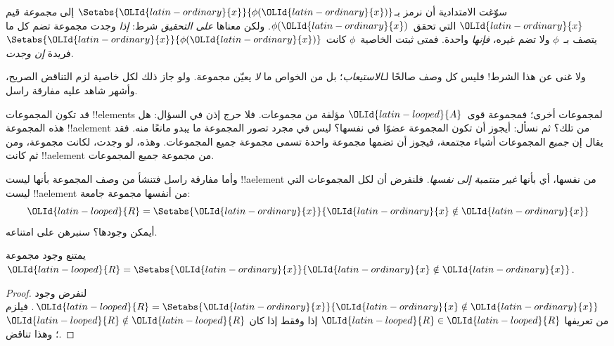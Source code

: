 \documentclass[../../../include/open-logic-section]{subfiles}
\begin{document}

سوّغت الامتدادية أن نرمز بـ$\Setabs{\OLId{latin-ordinary}{x}}{\phi(\OLId{latin-ordinary}{x})}$ إلى \emph{مجموعة}
قيم $\OLId{latin-ordinary}{x}$ التي تحقق~$\phi(\OLId{latin-ordinary}{x})$. ولكن معناها \emph{على التحقيق} شرط:
\emph{إذا} وجدت مجموعة تضم كل ما يتصف بـ~$\phi$ ولا تضم غيره،
\emph{فإنها} واحدة. فمتى ثبتت الخاصية~$\phi$ كانت
$\Setabs{\OLId{latin-ordinary}{x}}{\phi(\OLId{latin-ordinary}{x})}$ فريدة \emph{إن وجدت}.

ولا غنى عن هذا الشرط!{} فليس كل وصف صالحًا لـ\emph{الاستيعاب}؛
بل من الخواص ما \emph{لا} يعيّن مجموعة. ولو جاز ذلك لكل خاصية لزم
التناقض الصريح، وأشهر شاهد عليه مفارقة راسل.

قد تكون المجموعات !!{element}s لمجموعات أخرى؛ فمجموعة قوى~$\OLId{latin-looped}{A}$ مؤلفة
من مجموعات. فلا حرج إذن في السؤال: هل هذه المجموعة !!a{element}
من تلك؟ ثم نسأل: أيجوز أن تكون المجموعة عضوًا في نفسها؟
ليس في مجرد تصور المجموعة ما يبدو مانعًا منه. فقد يقال إن
\emph{جميع} المجموعات أشياء مجتمعة، فيجوز أن تضمها مجموعة واحدة
تسمى مجموعة جميع المجموعات. وهذه، لو وجدت، لكانت مجموعة، ومن ثم
كانت !!a{element} من مجموعة جميع المجموعات.

وأما مفارقة راسل فتنشأ من وصف المجموعة بأنها ليست !!a{element} من
نفسها، أي بأنها \emph{غير منتمية إلى نفسها}. فلنفرض أن لكل
المجموعات التي ليست !!a{element} من أنفسها مجموعة جامعة:
\[
\OLId{latin-looped}{R} = \Setabs{\OLId{latin-ordinary}{x}}{\OLId{latin-ordinary}{x} \notin \OLId{latin-ordinary}{x}}
\]
أيمكن وجودها؟ سنبرهن على امتناعه.

\begin{thm}
يمتنع وجود مجموعة $\OLId{latin-looped}{R} = \Setabs{\OLId{latin-ordinary}{x}}{\OLId{latin-ordinary}{x} \notin \OLId{latin-ordinary}{x}}$.
\end{thm}

\begin{proof}
لنفرض وجود $\OLId{latin-looped}{R} = \Setabs{\OLId{latin-ordinary}{x}}{\OLId{latin-ordinary}{x} \notin \OLId{latin-ordinary}{x}}$. فيلزم من تعريفها
$\OLId{latin-looped}{R} \in \OLId{latin-looped}{R}$ إذا وفقط إذا كان $\OLId{latin-looped}{R} \notin \OLId{latin-looped}{R}$؛ وهذا تناقض.
\end{proof}
\end{document}
